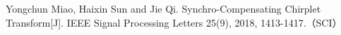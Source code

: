 
\begin{publications}{99}

    \item{Yongchun Miao, Haixin Sun and Jie Qi}. {Synchro-Compensating Chirplet Transform}[J]. IEEE Signal Processing Letters 25(9), 2018, 1413-1417.（SCI）

\end{publications}
